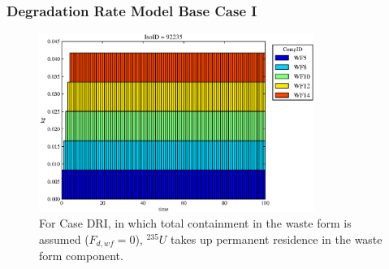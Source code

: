 

\begin{frame}[ctb!]
  \frametitle{Degradation Rate Model Base Case I}
\begin{figure}[ht]
\centering
\includegraphics[width=0.8\textwidth]{./images/drI.eps}
\caption[$^{235}U$ residence. Degradation Rate WF No Release.]{
For Case DRI, in which total containment in the waste form is assumed ($F_{d,wf}=0$), 
$^{235}U$ takes up permanent residence in the waste form component.
}
\label{fig:drIall}
\end{figure}
\end{frame}

